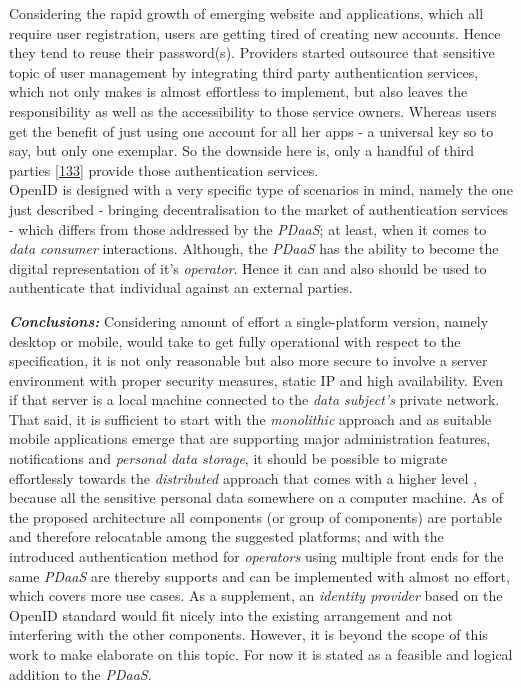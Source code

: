 \documentclass[12pt,english,a4paper,titlepage,cleardoublepage=empty,dottedtoc]{report}
\begin{document}
Considering the rapid growth of emerging website and applications, which
all require user registration, users are getting tired of creating new
accounts. Hence they tend to reuse their password(s). Providers started
outsource that sensitive topic of user management by integrating third
party authentication services, which not only makes is almost effortless
to implement, but also leaves the responsibility as well as the
accessibility to those service owners. Whereas users get the benefit of
just using one account for all her apps - a universal key so to say, but
only one exemplar. So the downside here is, only a handful of third
parties
{[}\protect\hyperlink{ref-web_2009-success-of-facebook-connect}{133}{]}
provide those authentication services.\\
OpenID is designed with a very specific type of scenarios in mind,
namely the one just described - bringing decentralisation to the market
of authentication services - which differs from those addressed by the
\emph{PDaaS}; at least, when it comes to \emph{data consumer}
interactions. Although, the \emph{PDaaS} has the ability to become the
digital representation of it's \emph{operator}. Hence it can and also
should be used to authenticate that individual against an external
parties.

\emph{\textbf{Conclusions:}} Considering amount of effort a
single-platform version, namely desktop or mobile, would take to get
fully operational with respect to the specification, it is not only
reasonable but also more secure to involve a server environment with
proper security measures, static IP and high availability. Even if that
server is a local machine connected to the \emph{data subject's} private
network. That said, it is sufficient to start with the \emph{monolithic}
approach and as suitable mobile applications emerge that are supporting
major administration features, notifications and \emph{personal data
storage}, it should be possible to migrate effortlessly towards the
\emph{distributed} approach that comes with a higher level , because all
the sensitive personal data somewhere on a computer machine. As of the
proposed architecture all components (or group of components) are
portable and therefore relocatable among the suggested platforms; and
with the introduced authentication method for \emph{operators} using
multiple front ends for the same \emph{PDaaS} are thereby supports and
can be implemented with almost no effort, which covers more use cases.
As a supplement, an \emph{identity provider} based on the OpenID
standard would fit nicely into the existing arrangement and not
interfering with the other components. However, it is beyond the scope
of this work to make elaborate on this topic. For now it is stated as a
feasible and logical addition to the \emph{PDaaS}.
\end{document}
